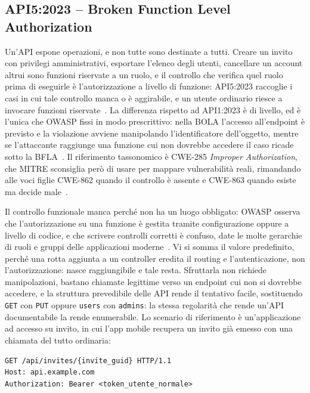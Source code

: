 \subsection{API5:2023 -- Broken Function Level Authorization}
\label{subsubsec:api5}

Un'API espone operazioni, e non tutte sono destinate a tutti. Creare un invito
con privilegi amministrativi, esportare l'elenco degli utenti, cancellare un
account altrui sono funzioni riservate a un ruolo, e il controllo che verifica
quel ruolo prima di eseguirle è l'autorizzazione a livello di funzione:
API5:2023 raccoglie i casi in cui tale controllo manca o è aggirabile, e un
utente ordinario riesce a invocare funzioni riservate~\cite{owasp2023api5}. La
differenza rispetto ad API1:2023 è di livello, ed è l'unica che OWASP fissi in
modo prescrittivo: nella BOLA l'accesso all'endpoint è previsto e la violazione
avviene manipolando l'identificatore dell'oggetto, mentre se l'attaccante
raggiunge una funzione cui non dovrebbe accedere il caso ricade sotto la
BFLA~\cite{owasp2023api1}. Il riferimento tassonomico è CWE-285 \emph{Improper
Authorization}, che MITRE sconsiglia però di usare per mappare vulnerabilità
reali, rimandando alle voci figlie CWE-862 quando il controllo è assente e
CWE-863 quando esiste ma decide male~\cite{cwe285}.

Il controllo funzionale manca perché non ha un luogo obbligato: OWASP osserva
che l'autorizzazione su una funzione è gestita tramite configurazione oppure a
livello di codice, e che scrivere controlli corretti è confuso, date le molte
gerarchie di ruoli e gruppi delle applicazioni moderne~\cite{owasp2023api5}. Vi
si somma il valore predefinito, perché una rotta aggiunta a un controller
eredita il routing e l'autenticazione, non l'autorizzazione: nasce
raggiungibile e tale resta. Sfruttarla non richiede manipolazioni, bastano
chiamate legittime verso un endpoint cui non si dovrebbe accedere, e la
struttura prevedibile delle API rende il tentativo facile, sostituendo
\texttt{GET} con \texttt{PUT} oppure \texttt{users} con \texttt{admins}: la
stessa regolarità che rende un'API documentabile la rende enumerabile. Lo scenario di riferimento è un'applicazione ad accesso su
invito, in cui l'app mobile recupera un invito già emesso con una chiamata del
tutto ordinaria:

\begin{verbatim}
GET /api/invites/{invite_guid} HTTP/1.1
Host: api.example.com
Authorization: Bearer <token_utente_normale>
\end{verbatim}

